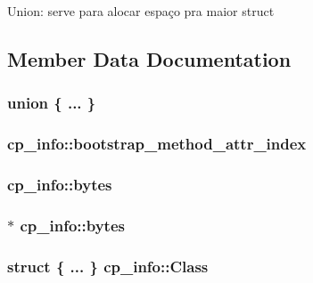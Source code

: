 Union\+: serve para alocar espaço pra maior struct 

\subsection{Member Data Documentation}
\subsubsection[{\texorpdfstring{"@5}{@5}}]{\setlength{\rightskip}{0pt plus 5cm}union \{ ... \} }\hypertarget{structcp__info_a0469358e891d5c89038d59f1807d00b2}{}\label{structcp__info_a0469358e891d5c89038d59f1807d00b2}
\subsubsection[{\texorpdfstring{bootstrap\+\_\+method\+\_\+attr\+\_\+index}{bootstrap_method_attr_index}}]{ cp\+\_\+info\+::bootstrap\+\_\+method\+\_\+attr\+\_\+index}\hypertarget{structcp__info_abad11f89efc244065e72ec811f9dc929}{}\label{structcp__info_abad11f89efc244065e72ec811f9dc929}
\subsubsection[{\texorpdfstring{bytes}{bytes}}]{ cp\+\_\+info\+::bytes}\hypertarget{structcp__info_a4dcce18f4a19e8112079dc11dc2f5386}{}\label{structcp__info_a4dcce18f4a19e8112079dc11dc2f5386}
\subsubsection[{\texorpdfstring{bytes}{bytes}}]{$\ast$ cp\+\_\+info\+::bytes}\hypertarget{structcp__info_a30f97eda54e30a923a217520316e9301}{}\label{structcp__info_a30f97eda54e30a923a217520316e9301}
\subsubsection[{\texorpdfstring{Class}{Class}}]{\setlength{\rightskip}{0pt plus 5cm}struct \{ ... \}   cp\+\_\+info\+::\+Class}\hypertarget{structcp__info_a322117cc9b35710232212d96443b9c46}{}\label{structcp__info_a322117cc9b35710232212d96443b9c46}
